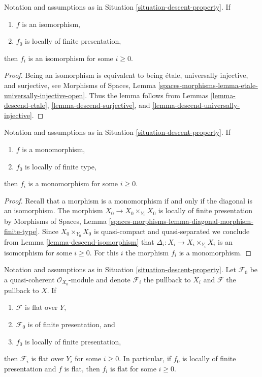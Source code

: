 \begin{lemma}
\label{lemma-descend-isomorphism}
Notation and assumptions as in Situation \ref{situation-descent-property}. If
\begin{enumerate}
\item $f$ is an isomorphism,
\item $f_0$ is locally of finite presentation,
\end{enumerate}
then $f_i$ is an isomorphism for some $i \geq 0$.
\end{lemma}

\begin{proof}
Being an isomorphism is equivalent to being \'etale, universally injective,
and surjective, see
Morphisms of Spaces, Lemma
\ref{spaces-morphisms-lemma-etale-universally-injective-open}.
Thus the lemma follows from
Lemmas \ref{lemma-descend-etale},
\ref{lemma-descend-surjective}, and
\ref{lemma-descend-universally-injective}.
\end{proof}

\begin{lemma}
\label{lemma-descend-monomorphism}
Notation and assumptions as in Situation \ref{situation-descent-property}. If
\begin{enumerate}
\item $f$ is a monomorphism,
\item $f_0$ is locally of finite type,
\end{enumerate}
then $f_i$ is a monomorphism for some $i \geq 0$.
\end{lemma}

\begin{proof}
Recall that a morphism is a monomorphism if and only if the diagonal is
an isomorphism. The morphism $X_0 \to X_0 \times_{Y_0} X_0$ is locally of
finite presentation by
Morphisms of Spaces, Lemma
\ref{spaces-morphisms-lemma-diagonal-morphism-finite-type}.
Since $X_0 \times_{Y_0} X_0$ is quasi-compact and quasi-separated
we conclude from
Lemma \ref{lemma-descend-isomorphism}
that $\Delta_i : X_i \to X_i \times_{Y_i} X_i$ is an isomorphism for
some $i \geq 0$. For this $i$ the morphism $f_i$ is a monomorphism.
\end{proof}

\begin{lemma}
\label{lemma-descend-flat}
Notation and assumptions as in Situation \ref{situation-descent-property}.
Let $\mathcal{F}_0$ be a quasi-coherent $\mathcal{O}_{X_0}$-module
and denote $\mathcal{F}_i$ the pullback to $X_i$ and $\mathcal{F}$
the pullback to $X$. If
\begin{enumerate}
\item $\mathcal{F}$ is flat over $Y$,
\item $\mathcal{F}_0$ is of finite presentation, and
\item $f_0$ is locally of finite presentation,
\end{enumerate}
then $\mathcal{F}_i$ is flat over $Y_i$ for some $i \geq 0$.
In particular, if $f_0$ is locally of finite presentation and
$f$ is flat, then $f_i$ is flat for some $i \geq 0$.
\end{lemma}

